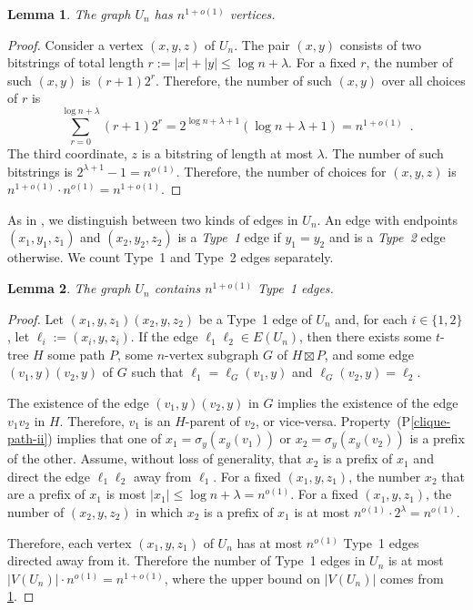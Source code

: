 \documentclass{patmorin}
\newcommand{\pref}[1]{(P\ref{#1})}
\newtheorem{lemma}{Lemma}
\begin{document}
\begin{lemma}\label{vertex-count}
    The graph $U_n$ has $n^{1+o(1)}$ vertices.
\end{lemma}

\begin{proof}
    Consider a vertex $(x,y,z)$ of $U_n$. The pair $(x,y)$ consists of two bitstrings of total length $r := |x|+|y|\le\log n + \lambda$.  For a fixed $r$, the number of such $(x,y)$ is $(r+1)2^{r}$. Therefore, the number of such $(x,y)$ over all choices of $r$ is
    \[
        \sum_{r=0}^{\log n + \lambda} (r+1)2^r = 2^{\log n + \lambda+1}(\log n+\lambda + 1) = n^{1+o(1)} \enspace .
    \]
    The third coordinate, $z$ is a bitstring of length at most $\lambda$. The number of such bitstrings is $2^{\lambda+1}-1=n^{o(1)}$.  Therefore, the number of choices for $(x,y,z)$ is $n^{1+o(1)}\cdot n^{o(1)}=n^{1+o(1)}$.
\end{proof}

As in \cite{esperet.joret.ea:sparse}, we distinguish between two kinds of edges in $U_n$.  An edge with endpoints $(x_1,y_1,z_1)$ and $(x_2,y_2,z_2)$ is a \emph{Type~1} edge if $y_1=y_2$ and is a \emph{Type~2} edge otherwise.  We count Type~1 and Type~2 edges separately.

\begin{lemma}\label{flat-edges}
    The graph $U_n$ contains $n^{1+o(1)}$ Type~1 edges.
\end{lemma}

\begin{proof}
    Let $(x_1,y,z_1)(x_2,y,z_2)$ be a Type~1 edge of $U_n$ and, for each $i\in\{1,2\}$, let $\ell_i:=(x_i,y,z_i)$.  If the edge $\ell_1\ell_2\in E(U_n)$, then there exists some $t$-tree $H$ some path $P$, some $n$-vertex subgraph $G$ of $H\boxtimes P$, and some edge $(v_1,y)(v_2,y)$ of $G$ such that $\ell_1=\ell_G(v_1,y)$ and $\ell_G(v_2,y)=\ell_2$.

    The existence of the edge $(v_1,y)(v_2,y)$ in $G$ implies the existence of the edge $v_1v_2$ in $H$.  Therefore, $v_1$ is an $H$-parent of $v_2$, or vice-versa. Property~\pref{clique-path-ii} implies that one of $x_1=\sigma_y(x_y(v_1))$ or $x_2=\sigma_y(x_y(v_2))$ is a prefix of the other.  Assume, without loss of generality, that $x_2$ is a prefix of $x_1$ and direct the edge $\ell_1\ell_2$ away from $\ell_1$.  For a fixed $(x_1,y,z_1)$, the number $x_2$ that are a prefix of $x_1$ is most $|x_1|\le\log n+\lambda=n^{o(1)}$. For a fixed $(x_1,y,z_1)$, the number of $(x_2,y,z_2)$ in which $x_2$ is a prefix of $x_1$ is at most $n^{o(1)}\cdot 2^{\lambda}=n^{o(1)}$.

    Therefore, each vertex $(x_1,y,z_1)$ of $U_n$ has at most $n^{o(1)}$ Type~1 edges directed away from it.  Therefore the number of Type~1 edges in $U_n$ is at most $|V(U_n)|\cdot n^{o(1)}=n^{1+o(1)}$, where the upper bound on $|V(U_n)|$ comes from \cref{vertex-count}.
\end{proof}
\end{document}
